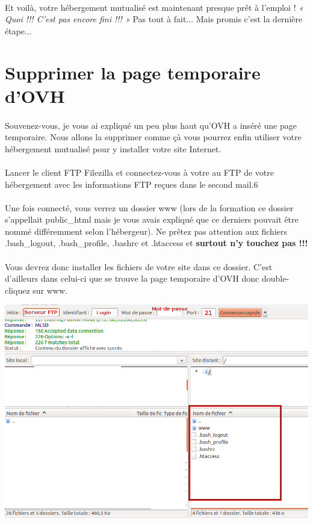 \documentclass[10pt,a4paper]{article}
\begin{document}
\paragraph{}Et voilà, votre hébergement mutualisé est maintenant presque prêt à l'emploi ! \textit{« Quoi !!! C'est pas encore fini !!! »} Pas tout à fait... Mais promis c'est la dernière étape...
\newpage
\section{Supprimer la page temporaire d'OVH}
\paragraph{}Souvenez-vous, je vous ai expliqué un peu plus haut qu'OVH a inséré une page temporaire. Nous allons la supprimer comme çà vous pourrez enfin utiliser votre hébergement mutualisé pour y installer votre site Internet.
\paragraph{}Lancer le client FTP Filezilla et connectez-vous à votre au FTP de votre hébergement avec les informations FTP reçues dans le second mail.6\paragraph{}Une fois connecté, vous verrez un dossier www (lors de la formation ce dossier s'appellait public\_html mais je vous avais expliqué que ce derniers pouvait être nommé différemment selon l'hébergeur). Ne prêtez pas attention aux fichiers .bash\_logout, .bash\_profile, .bashrc et .htaccess et \textbf{surtout n'y touchez pas !!!}
\paragraph{}Vous devrez donc installer les fichiers de votre site dans ce dossier. C'est d'ailleurs dans celui-ci que se trouve la page temporaire d'OVH donc double-cliquez sur www.
\begin{center}
\includegraphics[scale=0.3]{img/0296.png}
\end{center}
\end{document}
